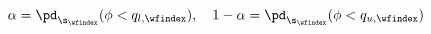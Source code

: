 \begin{equation}
  \alpha = \pd_{\s_{\wfindex}}(\phi < q_{l, \wfindex}), \quad
  1 - \alpha = \pd_{\s_{\wfindex}}(\phi < q_{u, \wfindex})
  \label{eqn:telescoping-quantiles}
\end{equation}